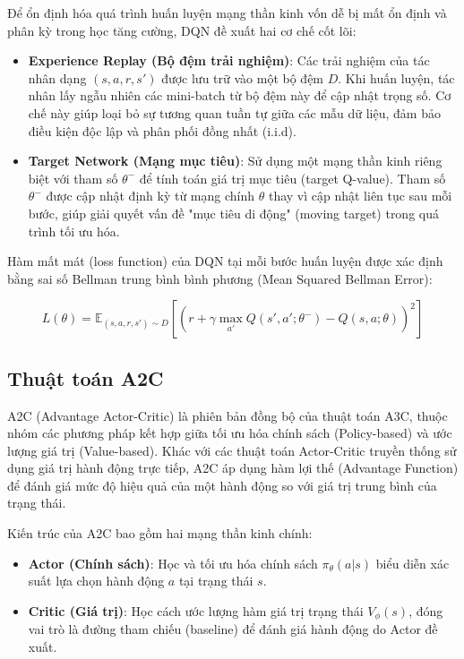 Để ổn định hóa quá trình huấn luyện mạng thần kinh vốn dễ bị mất ổn định và phân kỳ trong học tăng cường, DQN đề xuất hai cơ chế cốt lõi:
\begin{itemize}
    \item \textbf{Experience Replay (Bộ đệm trải nghiệm)}: Các trải nghiệm của tác nhân dạng $(s, a, r, s')$ được lưu trữ vào một bộ đệm $D$. Khi huấn luyện, tác nhân lấy ngẫu nhiên các mini-batch từ bộ đệm này để cập nhật trọng số. Cơ chế này giúp loại bỏ sự tương quan tuần tự giữa các mẫu dữ liệu, đảm bảo điều kiện độc lập và phân phối đồng nhất (i.i.d).
    \item \textbf{Target Network (Mạng mục tiêu)}: Sử dụng một mạng thần kinh riêng biệt với tham số $\theta^-$ để tính toán giá trị mục tiêu (target Q-value). Tham số $\theta^-$ được cập nhật định kỳ từ mạng chính $\theta$ thay vì cập nhật liên tục sau mỗi bước, giúp giải quyết vấn đề "mục tiêu di động" (moving target) trong quá trình tối ưu hóa.
\end{itemize}

Hàm mất mát (loss function) của DQN tại mỗi bước huấn luyện được xác định bằng sai số Bellman trung bình bình phương (Mean Squared Bellman Error):

\begin{equation}
L(\theta) = \mathbb{E}_{(s, a, r, s') \sim D} \left[ \left( r + \gamma \max_{a'} Q(s', a'; \theta^-) - Q(s, a; \theta) \right)^2 \right]
\end{equation}

\subsection{Thuật toán A2C}

A2C (Advantage Actor-Critic) là phiên bản đồng bộ của thuật toán A3C, thuộc nhóm các phương pháp kết hợp giữa tối ưu hóa chính sách (Policy-based) và ước lượng giá trị (Value-based). Khác với các thuật toán Actor-Critic truyền thống sử dụng giá trị hành động trực tiếp, A2C áp dụng hàm lợi thế (Advantage Function) để đánh giá mức độ hiệu quả của một hành động so với giá trị trung bình của trạng thái.

Kiến trúc của A2C bao gồm hai mạng thần kinh chính:
\begin{itemize}
    \item \textbf{Actor (Chính sách)}: Học và tối ưu hóa chính sách $\pi_\theta(a|s)$ biểu diễn xác suất lựa chọn hành động $a$ tại trạng thái $s$.
    \item \textbf{Critic (Giá trị)}: Học cách ước lượng hàm giá trị trạng thái $V_\phi(s)$, đóng vai trò là đường tham chiếu (baseline) để đánh giá hành động do Actor đề xuất.
\end{itemize}

